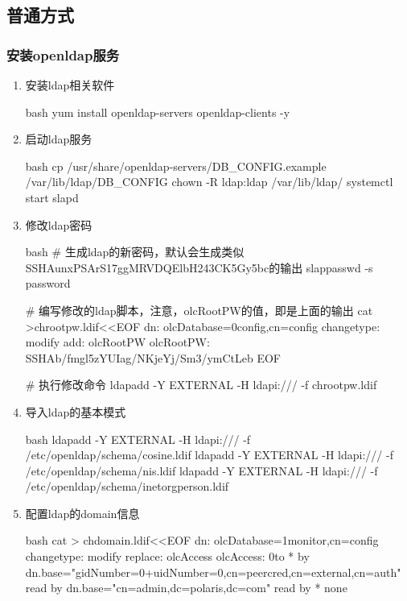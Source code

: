 \subsection{普通方式}

\subsubsection{安装openldap服务}
\begin{enumerate}

  \item 安装ldap相关软件

  \begin{code-block}{bash}
  yum install openldap-servers openldap-clients -y
  \end{code-block}

  \item 启动ldap服务

  \begin{code-block}{bash}
  cp /usr/share/openldap-servers/DB_CONFIG.example /var/lib/ldap/DB_CONFIG
  chown -R ldap:ldap  /var/lib/ldap/
  systemctl start slapd
  \end{code-block}

  \item 修改ldap密码

  \begin{code-block}{bash}
  # 生成ldap的新密码，默认会生成类似{SSHA}unxPSArS17ggMRVDQElbH243CK5Gy5bc的输出
  slappasswd -s password

  # 编写修改的ldap脚本，注意，olcRootPW的值，即是上面的输出
  cat >chrootpw.ldif<<EOF
  dn: olcDatabase={0}config,cn=config
  changetype: modify
  add: olcRootPW
  olcRootPW: {SSHA}b/fmgl5zYUIag/NKjeYj/Sm3/ymCtLeb
  EOF

  # 执行修改命令
  ldapadd -Y EXTERNAL -H ldapi:/// -f chrootpw.ldif
  \end{code-block}

  \item 导入ldap的基本模式

  \begin{code-block}{bash}
  ldapadd -Y EXTERNAL -H ldapi:/// -f /etc/openldap/schema/cosine.ldif
  ldapadd -Y EXTERNAL -H ldapi:/// -f /etc/openldap/schema/nis.ldif
  ldapadd -Y EXTERNAL -H ldapi:/// -f /etc/openldap/schema/inetorgperson.ldif
  \end{code-block}


  \item 配置ldap的domain信息

  \begin{code-block}{bash}
  cat > chdomain.ldif<<EOF
  dn: olcDatabase={1}monitor,cn=config
  changetype: modify
  replace: olcAccess
  olcAccess: {0}to * by dn.base="gidNumber=0+uidNumber=0,cn=peercred,cn=external,cn=auth" read by dn.base="cn=admin,dc=polaris,dc=com" read by * none


\end{code-block}
\end{enumerate}
